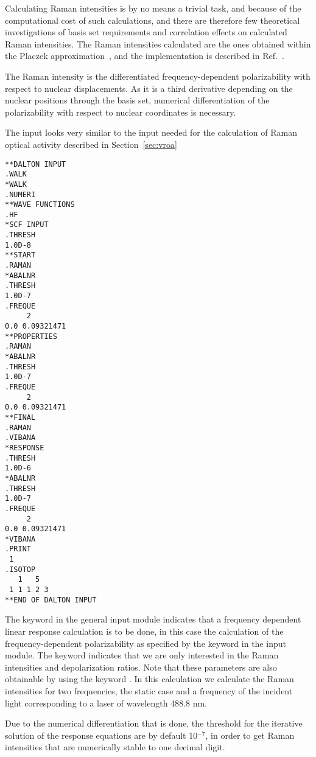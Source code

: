  Calculating Raman intensities is by no means
a trivial task, and
because of the computational cost of such calculations, and there are
therefore few theoretical investigations of basis set requirements and
correlation effects on calculated Raman intensities. The Raman
intensities calculated are the ones obtained within the Placzek
approximation~\cite{placzek},
and the implementation is described in Ref.~\cite{thkrklbpjjofd99}.

The Raman intensity is the differentiated frequency-dependent
polarizability with respect to nuclear displacements.
As it is a third derivative depending on the nuclear positions through
the basis set, numerical differentiation of
the polarizability with respect to nuclear coordinates is
necessary.

The input looks very similar to the input needed for the calculation
of Raman optical activity  described
in Section~\ref{sec:vroa}

\begin{verbatim}
**DALTON INPUT
.WALK
*WALK
.NUMERI
**WAVE FUNCTIONS
.HF
*SCF INPUT
.THRESH
1.0D-8
**START
.RAMAN
*ABALNR
.THRESH
1.0D-7
.FREQUE
     2
0.0 0.09321471
**PROPERTIES
.RAMAN
*ABALNR
.THRESH
1.0D-7
.FREQUE
     2
0.0 0.09321471
**FINAL
.RAMAN
.VIBANA
*RESPONSE
.THRESH
1.0D-6
*ABALNR
.THRESH
1.0D-7
.FREQUE
     2
0.0 0.09321471
*VIBANA
.PRINT
 1
.ISOTOP
   1   5
 1 1 1 2 3
**END OF DALTON INPUT
\end{verbatim}

The keyword  in the general input module indicates that
a frequency dependent linear response
calculation is to be done, in
this case the calculation of the frequency-dependent
polarizability as
specified by the  keyword in the  input
module. The keyword  indicates that we are only
interested in the Raman intensities and
depolarization ratios. Note
that these parameters are also obtainable by using the keyword
. In this calculation we calculate the Raman intensities for two
frequencies, the static case and a frequency of the incident light
corresponding to a laser of wavelength 488.8 nm. 

Due to the numerical differentiation
that is done, the threshold for
the iterative solution of the response equations are by default
10$^{-7}$, in order to get Raman intensities that are numerically
stable to one decimal digit.

